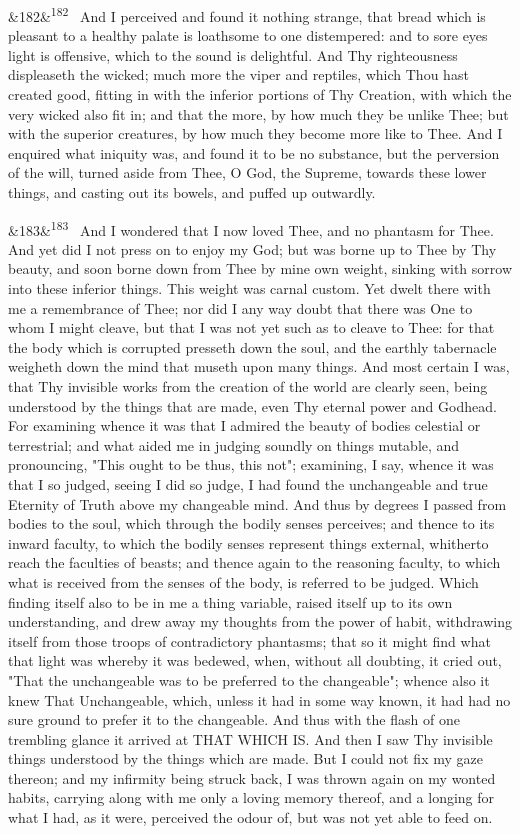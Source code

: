 \documentclass[12pt]{article}
\newcommand{\para}[1][]{\par\noindent\ifx&#1&\else\textsuperscript{\footnotesize #1}~\fi}
\begin{document}
\para[182] And I perceived and found it nothing strange, that bread which is pleasant to a healthy palate is loathsome to one distempered: and to sore eyes light is offensive, which to the sound is delightful. And Thy righteousness displeaseth the wicked; much more the viper and reptiles, which Thou hast created good, fitting in with the inferior portions of Thy Creation, with which the very wicked also fit in; and that the more, by how much they be unlike Thee; but with the superior creatures, by how much they become more like to Thee. And I enquired what iniquity was, and found it to be no substance, but the perversion of the will, turned aside from Thee, O God, the Supreme, towards these lower things, and casting out its bowels, and puffed up outwardly.

\para[183] And I wondered that I now loved Thee, and no phantasm for Thee. And yet did I not press on to enjoy my God; but was borne up to Thee by Thy beauty, and soon borne down from Thee by mine own weight, sinking with sorrow into these inferior things. This weight was carnal custom. Yet dwelt there with me a remembrance of Thee; nor did I any way doubt that there was One to whom I might cleave, but that I was not yet such as to cleave to Thee: for that the body which is corrupted presseth down the soul, and the earthly tabernacle weigheth down the mind that museth upon many things. And most certain I was, that Thy invisible works from the creation of the world are clearly seen, being understood by the things that are made, even Thy eternal power and Godhead. For examining whence it was that I admired the beauty of bodies celestial or terrestrial; and what aided me in judging soundly on things mutable, and pronouncing, "This ought to be thus, this not"; examining, I say, whence it was that I so judged, seeing I did so judge, I had found the unchangeable and true Eternity of Truth above my changeable mind. And thus by degrees I passed from bodies to the soul, which through the bodily senses perceives; and thence to its inward faculty, to which the bodily senses represent things external, whitherto reach the faculties of beasts; and thence again to the reasoning faculty, to which what is received from the senses of the body, is referred to be judged. Which finding itself also to be in me a thing variable, raised itself up to its own understanding, and drew away my thoughts from the power of habit, withdrawing itself from those troops of contradictory phantasms; that so it might find what that light was whereby it was bedewed, when, without all doubting, it cried out, "That the unchangeable was to be preferred to the changeable"; whence also it knew That Unchangeable, which, unless it had in some way known, it had had no sure ground to prefer it to the changeable. And thus with the flash of one trembling glance it arrived at THAT WHICH IS. And then I saw Thy invisible things understood by the things which are made. But I could not fix my gaze thereon; and my infirmity being struck back, I was thrown again on my wonted habits, carrying along with me only a loving memory thereof, and a longing for what I had, as it were, perceived the odour of, but was not yet able to feed on.
\end{document}
